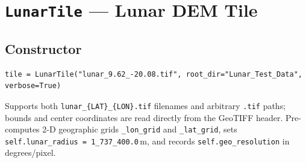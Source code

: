 \documentclass[11pt,letterpaper]{article}
\begin{document}
\section{\texttt{LunarTile} --- Lunar DEM Tile}

\subsection{Constructor}
\begin{lstlisting}
tile = LunarTile("lunar_9.62_-20.08.tif", root_dir="Lunar_Test_Data", verbose=True)
\end{lstlisting}
Supports both \texttt{lunar\_\{LAT\}\_\{LON\}.tif} filenames and arbitrary \texttt{.tif} paths; bounds and center coordinates are read directly from the GeoTIFF header. Pre-computes 2-D geographic grids \texttt{\_lon\_grid} and \texttt{\_lat\_grid}, sets \texttt{self.lunar\_radius = 1\_737\_400.0}\,m, and records \texttt{self.geo\_resolution} in degrees/pixel.
\end{document}
